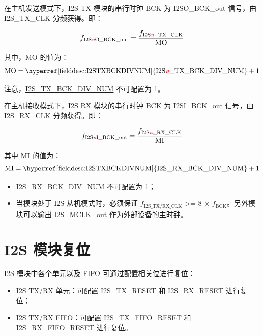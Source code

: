 \documentclass[main\_\_CN.tex]{subfiles}
\begin{document}
在主机发送模式下，I2S TX 模块的串行时钟 BCK 为 I2SO\_BCK\_out 信号，由 I2S\_TX\_CLK 分频获得。即：

$$f_{\textrm{I2S\textcolor{red}{\it{n}}O\_BCK\_out}} = \frac{f_{\textrm{I2S\textcolor{red}{\it{n}}\_TX\_CLK}}}{\textrm{MO}}$$

其中，MO 的值为：
$$ \textrm{MO} = \textrm{\hyperref[fielddesc:I2STXBCKDIVNUM]{I2S\regindex{n}\_TX\_BCK\_DIV\_NUM}} + 1 $$

\vspace{-1em}
\begin{tiplisting}
注意，\hyperref[fielddesc:I2STXBCKDIVNUM]{I2S\_TX\_BCK\_DIV\_NUM} 不可配置为 1。
\end{tiplisting}

在主机接收模式下，I2S RX 模块的串行时钟 BCK 为 I2SI\_BCK\_out 信号，由 I2S\_RX\_CLK 分频获得。即：

$$f_{\textrm{I2S\textcolor{red}{\it{n}}I\_BCK\_out}} = \frac{f_{\textrm{I2S\textcolor{red}{\it{n}}\_RX\_CLK}}}{\textrm{MI}}$$

其中 MI 的值为：
$$ \textrm{MI} = \textrm{\hyperref[fielddesc:I2STXBCKDIVNUM]{I2S\_RX\_BCK\_DIV\_NUM}} + 1 $$
\begin{tiplisting}
\vspace{-2em}
\begin{itemize}
    \item \hyperref[fielddesc:I2SRXBCKDIVNUM]{I2S\_RX\_BCK\_DIV\_NUM} 不可配置为 1；
    \item 当模块处于 I2S 从机模式时，必须保证 $f_{\textrm{I2S\_TX/RX\_CLK}}$ >= 8 × $f_{\textrm{BCK}}$。另外模块可以输出 I2S\_MCLK\_out 作为外部设备的主时钟。
\end{itemize}
\end{tiplisting}

\section{I2S 模块复位} \label{sec:i2s-reset}

I2S 模块中各个单元以及 FIFO 可通过配置相关位进行复位：

\begin{itemize}
\item I2S TX/RX 单元：可配置 \hyperref[fielddesc:I2STXRESET]{I2S\_TX\_RESET} 和 \hyperref[fielddesc:I2SRXRESET]{I2S\_RX\_RESET} 进行复位；
\item I2S TX/RX FIFO：可配置 \hyperref[fielddesc:I2STXFIFORESET]{I2S\_TX\_FIFO\_RESET} 和 \hyperref[fielddesc:I2SRXFIFORESET]{I2S\_RX\_FIFO\_RESET} 进行复位。
\end{itemize}
\end{document}
